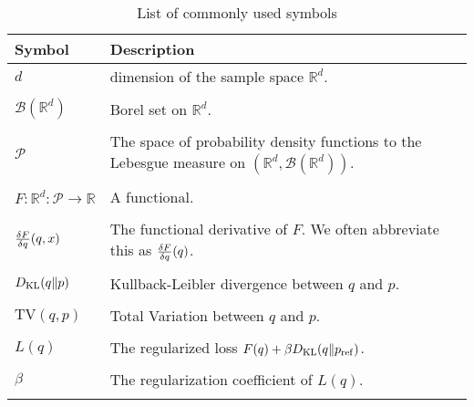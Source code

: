 
\setlength{\LTpre}{0pt}
\setlength{\LTpost}{0pt}
\begin{longtable}{|>{\raggedright\arraybackslash}p{3cm}|>{\raggedright\arraybackslash}p{9cm}|}
\caption{List of commonly used symbols}
\\
\hline
Symbol & Description \\ \hline

$d$ & dimension of the sample space $\mathbb{R}^d$. \\ & \\ %
$\mathcal{B}(\mathbb{R}^d)$ & Borel set on $\mathbb{R}^d$. \\ & \\ %
$\mathcal{P}$ & The space of probability density functions to the Lebesgue measure on $(\mathbb{R}^d, \mathcal{B}(\mathbb{R}^d))$. \\  & \\ %

% 
$F:\mathbb{R}^d:\mathcal{P}\to \mathbb{R}$ & A functional.  \\ & \\ %

$\frac{\delta F}{\delta q}(q,x)$ & The functional derivative of $F$. We often abbreviate this as $\frac{\delta F}{\delta q}(q)$. \\ & \\ %

$D_{\mathrm{KL}}(q\|p)$ & Kullback-Leibler divergence between $q$ and $p$.  \\ & \\ %
$\mathrm{TV}(q,p)$ & Total Variation between $q$ and $p$.  \\ & \\ %

$L(q)$ & The regularized loss $F(q) + \beta D_{\mathrm{KL}}(q\|p_{\rm{ref}})$.  \\ & \\ %
$\beta$ & The regularization coefficient of $L(q)$.  \\ & \\ %



\end{longtable}

